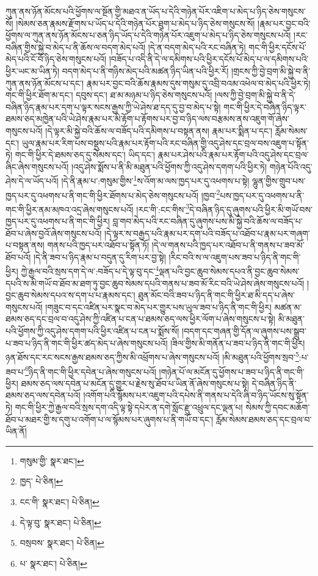 ཀུན་ནས་ཉོན་མོངས་པའི་ཕྱོགས་ལ་སྔོན་གྱི་མཐའ་ན་ཡོད་པ་དེའི་གཉེན་པོར་འཇིག་པ་མེད་པ་ཉིད་ཅེས་གསུངས་སོ། །སེམས་ཅན་རྣམས་རྫོགས་པ་ཡོད་པ་དེའི་གཉེན་པོར་ཐུག་པ་མེད་པ་ཉིད་ཅེས་གསུངས་སོ། །རྣམ་པར་བྱང་བའི་ཕྱོགས་ལ་ཀུན་ནས་ཉོན་མོངས་པ་ཅན་ཉིད་ཡོད་པ་དེའི་གཉེན་པོར་འཇུག་པ་མེད་པ་ཉིད་ཅེས་གསུངས་པའོ། །རང་བཞིན་གྱིས་སྐྱེ་བ་མེད་པ་ནི་ཆོས་ལ་བདག་མེད་པའོ། །དེ་ན་བདག་མེད་པའི་རང་བཞིན་ཏེ། གང་གི་ཕྱིར་དངོས་པོ་མེད་པའི་ངོ་བོ་ཉིད་ཅེས་གསུངས་པའོ། །བཟོད་པ་འདི་ནི་དེ་ལ་དམིགས་པའི་ཕྱིར་དངོས་པོ་མེད་པ་ལ་དམིགས་པའི་ཕྱིར་ཡང་མ་ཡིན་ཏེ། བདག་མེད་པ་ནི་གཉིས་མེད་པའི་མཚན་ཉིད་ཡིན་པའི་ཕྱིར་རོ། །གྲངས་ཀྱི་བྱེ་བྲག་མི་སྐྱེ་བ་ནི་ཀུན་ནས་ཉོན་མོངས་པ་དང་། རྣམ་པར་བྱང་བའི་ཆོས་རྣམས་དུས་གསུམ་དུ་འབྲི་བའམ་འཕེལ་བ་མེད་པའི་ཕྱིར་ཏེ། གང་གི་ཕྱིར་ཐོག་མ་དང་། དབུས་དང་། ཐ་མ་མཉམ་པ་ཉིད་ཅེས་གསུངས་པའོ། །ལས་ཀྱི་བྱེ་བྲག་མི་སྐྱེ་བ་ནི་དེ་བཞིན་ཉིད་རྣམ་པར་དག་པ་ལྟར་སངས་རྒྱས་ཀྱི་ཡེ་ཤེས་ཐ་དད་དུ་བྱ་བ་མེད་པ་སྟེ། གང་གི་ཕྱིར་དེ་བཞིན་ཉིད་ལྟར་ཐམས་ཅད་མཁྱེན་པའི་ཡེ་ཤེས་རྣམ་པར་མི་རྟོག་པ་རྟོགས་པར་བྱ་བ་ཉིད་ལས་བརྩམས་ནས་འཇུག་གོ་ཞེས་གསུངས་པའོ། །དེ་ལྟར་མི་སྐྱེ་བའི་ཆོས་ལ་བཟོད་པའི་དམིགས་པ་བསྟན་ནས། རྣམ་པར་སྨིན་པ་དང་། རློམ་སེམས་དང་། ཡུལ་རྣམ་པར་རིག་པས་བསྡུས་པའི་རྣམ་པར་རྟོག་པའི་རང་བཞིན་གྱི་འདུ་ཤེས་དང་བྲལ་བས་འཇུག་པ་སྟོན་ཏེ། གང་གི་ཕྱིར་དེ་ཐམས་ཅད་དུ་སེམས་དང་། ཡིད་དང་། རྣམ་པར་ཤེས་པའི་རྣམ་པར་རྟོག་པའི་འདུ་ཤེས་དང་བྲལ་ཞིང་ཞེས་གསུངས་པའོ། །འདུ་ཤེས་སྨོས་པ་ནི་མི་མཐུན་པའི་ཕྱོགས་ཀྱི་འདུ་ཤེས་དགག་པའི་ཕྱིར་ཏེ། གཉེན་པོའི་འདུ་ཤེས་དེ་ལ་ཡོད་པའོ། །དེ་ནི་རྣམ་པ་:གསུམ་གྱིས་\footnote{གསུམ་གྱི་  སྣར་ཐང་། }ས་འོག་མ་ལས་ཁྱད་པར་དུ་འཕགས་པ་སྟེ། ལྷུན་གྱིས་གྲུབ་པས་ཁྱད་པར་དུ་འཕགས་པ་ནི་གང་གི་ཕྱིར་ཐོགས་པ་མེད་ཅེས་གསུངས་པའོ། །ཁྱབ་\footnote{ཁྱད་  པེ་ཅིན། }པས་ཁྱད་པར་དུ་འཕགས་པ་ནི་གང་གི་ཕྱིར་ནམ་མཁའ་འདྲ་ཞེས་གསུངས་པའོ། །རང་གི་:ངང་གིས་\footnote{ངང་གི་  སྣར་ཐང་།  པེ་ཅིན། }དེ་བཞིན་ཉིད་དུ་ཞུགས་པའི་ཕྱིར་མི་གཡོ་བས་ཁྱད་པར་དུ་འཕགས་པ་ནི་གང་གི་ཕྱིར། བླ་གབ་མེད་པའི་རང་བཞིན་དུ་ཞུགས་པས་མི་སྐྱེ་བའི་ཆོས་ལ་བཟོད་པ་ཐོབ་པ་ཞེས་བྱའོ་ཞེས་གསུངས་པའོ། །དེ་ལྟར་ས་བརྒྱད་པའི་རྣམ་པར་དག་པའི་བཟོད་པ་འཐོབ་པ་རྣམ་པར་གཞག་པ་བསྟན་ནས། གནས་པའི་ཁྱད་པར་འཐོབ་པ་སྟོན་ཏོ། །དེ་ལ་གནས་པའི་ཁྱད་པར་འཐོབ་པ་ནི་གནས་པ་ཟབ་མོ་ཐོབ་པའོ། །དེ་ནི་ཟབ་པ་ཉིད་རྣམ་པ་བདུན་དུ་རིག་པར་བྱ་སྟེ། །རིང་བའི་ས་ལ་འཇུག་པས་ཟབ་པ་ཉིད་ནི་གང་གི་ཕྱིར། ཀྱེ་རྒྱལ་བའི་སྲས་དག་དེ་ལ་:བཟོད་པ་དེ་ལྟ་བུ་དང་\footnote{དེ་ལྟ་བུ་  སྣར་ཐང་།  པེ་ཅིན། }ལྡན་པའི་བྱང་ཆུབ་སེམས་དཔའ་ནི་བྱང་ཆུབ་སེམས་དཔའི་ས་མི་གཡོ་བ་ཐོབ་མ་ཐག་ཏུ་བྱང་ཆུབ་སེམས་དཔའི་གནས་པ་ཟབ་མོ་རིང་བའི་ཡེ་ཤེས་ཞེས་གསུངས་པའོ། །བྱང་ཆུབ་སེམས་དཔའ་ས་དག་པ་པ་རྣམས་དང་། ཐུན་མོང་བའི་ཟབ་པ་ཉིད་ནི་གང་གི་ཕྱིར་ཐ་མི་དད་པ་ཞེས་གསུངས་པའོ། །གཟུང་བ་དང་འཛིན་པར་སྣང་བ་མེད་པར་གྱུར་པས་ཡུལ་ཟབ་པ་ཉིད་ནི་གང་གི་ཕྱིར། མཚན་མ་ཐམས་ཅད་དང་བྲལ་བ་འདུ་ཤེས་ཀྱི་འཛིན་པ་ངན་པ་ཐམས་ཅད་ལས་ཕྱིར་ལོག་པ་ཞེས་གསུངས་པ་སྟེ། མི་མཐུན་པའི་ཕྱོགས་ཀྱི་འདུ་ཤེས་དགག་པའི་ཕྱིར་འཛིན་པ་ངན་པ་སྨོས་སོ། །བདག་དང་གཞན་གྱི་དོན་ལ་ཞུགས་པས་སྒྲུབ་པ་ཟབ་པ་ཉིད་ནི་གང་གི་ཕྱིར་ཚད་མེད་པ་ཞེས་གསུངས་པའོ། །ཟིལ་གྱིས་མི་གནོན་པ་ཟབ་པ་ཉིད་ནི་གང་གི་ཕྱིར། ཉན་ཐོས་དང་རང་སངས་རྒྱས་ཐམས་ཅད་ཀྱིས་མི་འཕྲོགས་པ་ཞེས་གསུངས་པའོ། །མི་མཐུན་པའི་ཕྱོགས་སྲབ་\footnote{བསྲབས་  སྣར་ཐང་།  པེ་ཅིན། }:པ་ཟབ་པ་\footnote{པ་  སྣར་ཐང་།  པེ་ཅིན། }ཉིད་ནི་གང་གི་ཕྱིར་དབེན་པ་ཞེས་གསུངས་པའོ། །གཉེན་པོ་ལ་མངོན་དུ་ཕྱོགས་པ་ཟབ་པ་ཉིད་ནི་གང་གི་ཕྱིར། ཐམས་ཅད་ལས་དབེན་པ་མངོན་དུ་གྱུར་པ་རྗེས་སུ་ཐོབ་པ་ཡིན་ནོ་ཞེས་གསུངས་པ་སྟེ། དེ་བཞིན་ཉིད་ནི་ཐམས་ཅད་ལས་དབེན་པའོ། །འགོག་པའི་སྙོམས་པར་འཇུག་པའི་དཔེས་ནི་གནས་པ་དེའི་ཞི་བ་ཉིད་ཡོངས་སུ་སྟོན་ཏེ། གང་གི་ཕྱིར་ཀྱེ་རྒྱལ་བའི་སྲས་དག་འདི་ལྟ་སྟེ་དཔེར་ན་དགེ་སློང་རྫུ་འཕྲུལ་དང་ལྡན་པ། སེམས་ཀྱི་དབང་མཆོག་ཐོབ་པ་མཐར་གྱི་ས་དགུ་པ་འགོག་པ་ལ་སྙོམས་པར་ཞུགས་པ་ནི་གཡོ་བ་དང་། རློམ་སེམས་ཐམས་ཅད་དང་བྲལ་བ་ཡིན་ནོ། 